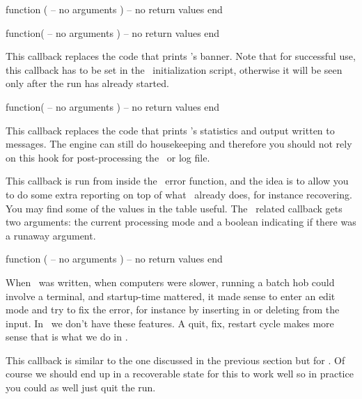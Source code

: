 \starttyping[option=LUA]
function (
    -- no arguments
)
    -- no return values
end
\stoptyping

\stopsubsection

\startsubsection[title=start_run]

\starttyping[option=LUA]
function(
    -- no arguments
)
    -- no return values
end
\stoptyping

This callback replaces the code that prints \LUATEX's banner. Note that for
successful use, this callback has to be set in the \LUA\ initialization script,
otherwise it will be seen only after the run has already started.

\stopsubsection

\startsubsection[title=stop_run]

\starttyping[option=LUA]
function(
    -- no arguments
)
    -- no return values
end
\stoptyping

This callback replaces the code that prints \LUATEX's statistics and \quote
{output written to} messages. The engine can still do housekeeping and therefore
you should not rely on this hook for post-processing the \PDF\ or log file.

\stopsubsection

\startsubsection[title=intercept_tex_error]

This callback is run from inside the \TEX\ error function, and the idea is to
allow you to do some extra reporting on top of what \TEX\ already does, for
instance recovering. You may find some of the values in the  table
useful. The \TEX\ related callback gets two arguments: the current processing
mode and a boolean indicating if there was a runaway argument.

\starttyping[option=LUA]
function (
    -- no arguments
)
    -- no return values
end
\stoptyping

When \TEX\ was written, when computers were slower, running a batch hob could
involve a terminal, and startup-time mattered, it made sense to enter an edit
mode and try to fix the error, for instance by inserting in or deleting from the
input. In \LUAMETATEX\ we don't have these features. A quit, fix, restart cycle
makes more sense that is what we do in \CONTEXT.

\stopsubsection

\startsubsection[title=intercept_lua_error]

This callback is similar to the one discussed in the previous section but for
\LUA. Of course we should end up in a recoverable state for this to work well so
in practice you could as well just quit the run.

